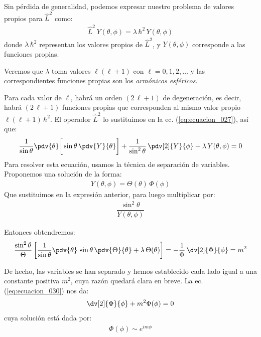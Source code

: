 Sin pérdida de generalidad, podemos expresar nuestro problema de valores propios para $\hat{L}^{2}$ como:
\begin{align}
\hat{L}^{2} \, Y(\theta, \phi) = \lambda \, \hbar^{2} \, Y(\theta, \phi)
\label{eq:ecuacion_027}
\end{align}
donde $\lambda \, \hbar^{2}$ representan los valores propios de $\hat{L}^{2}$, y $Y(\theta, \phi)$ corresponde a las funciones propias. 
\par
Veremos que $\lambda$ toma valores $\ell (\ell + 1)$ con $\ell = 0, 1, 2, \ldots$ y las correspondientes funciones propias son los \emph{armónicos esféricos}.
\par
Para cada valor de $\ell$, habrá un orden $(2 \, \ell + 1)$ de degeneración, es decir, habrá $(2 \, \ell + 1)$ funciones propias que corresponden al mismo valor propio $\ell (\ell + 1) \, \hbar^{2}$. El operador $\hat{L}^{2}$ lo sustituimos en la ec. (\ref{eq:ecuacion_027}), así que:
\begin{align}
\dfrac{1}{\sin \theta} \pdv{\theta} \bigg[ \sin \theta \, \pdv{Y}{\theta} \bigg] + \dfrac{1}{\sin^{2} \theta} \, \pdv[2]{Y}{\phi} + \lambda \, Y(\theta, \phi) = 0
\end{align}
Para resolver esta ecuación, usamos la técnica de separación de variables. Proponemos una solución de la forma:
\begin{align}
Y(\theta, \phi) = \Theta(\theta) \, \Phi(\phi)
\label{eq:ecuacion_029}
\end{align}
Que sustituimos en la expresión anterior, para luego multiplicar por:
\begin{align*}
\dfrac{\sin^{2} \theta}{Y(\theta, \phi)}
\end{align*}

Entonces obtendremos:
\begin{align}
\dfrac{\sin^{2} \theta}{\Theta} \left[ \dfrac{1}{\sin \theta} \pdv{\theta} \, \sin \theta \, \pdv{\Theta}{\theta} + \lambda \, \Theta (\theta) \right] = -  \dfrac{1}{\Phi} \, \dv[2]{\Phi}{\phi} = m^{2}
\label{eq:ecuacion_030}
\end{align}

De hecho, las variables se han separado y hemos establecido cada lado igual a una constante positiva $m^{2}$, cuya razón quedará clara en breve. La ec. (\ref{eq:ecuacion_030}) nos da:
\begin{align*}
\dv[2]{\Phi}{\phi} + m^{2} \Phi (\phi) = 0
\end{align*}
cuya solución está dada por:
\begin{align*}
\Phi(\phi) \sim e^{i m \phi}
\end{align*}

